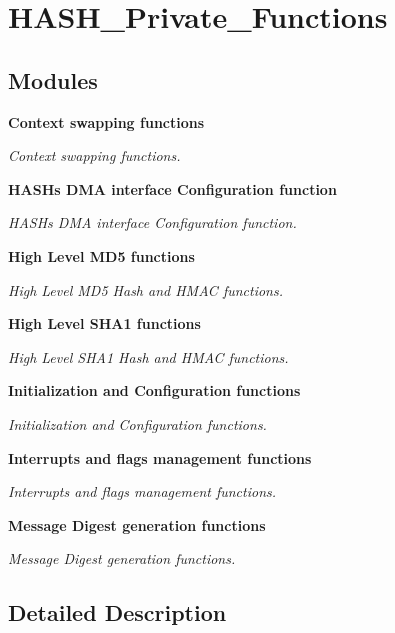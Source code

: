 \section{H\+A\+S\+H\+\_\+\+Private\+\_\+\+Functions}
\label{group__HASH__Private__Functions}
\subsection*{Modules}
\begin{DoxyCompactItemize}
\item 
\textbf{ Context swapping functions}
\begin{DoxyCompactList}\small\item\em Context swapping functions. \end{DoxyCompactList}\item 
\textbf{ H\+A\+S\+H\textquotesingle{}s D\+M\+A interface Configuration function}
\begin{DoxyCompactList}\small\item\em H\+A\+SH\textquotesingle{}s D\+MA interface Configuration function. \end{DoxyCompactList}\item 
\textbf{ High Level M\+D5 functions}
\begin{DoxyCompactList}\small\item\em High Level M\+D5 Hash and H\+M\+AC functions. \end{DoxyCompactList}\item 
\textbf{ High Level S\+H\+A1 functions}
\begin{DoxyCompactList}\small\item\em High Level S\+H\+A1 Hash and H\+M\+AC functions. \end{DoxyCompactList}\item 
\textbf{ Initialization and Configuration functions}
\begin{DoxyCompactList}\small\item\em Initialization and Configuration functions. \end{DoxyCompactList}\item 
\textbf{ Interrupts and flags management functions}
\begin{DoxyCompactList}\small\item\em Interrupts and flags management functions. \end{DoxyCompactList}\item 
\textbf{ Message Digest generation functions}
\begin{DoxyCompactList}\small\item\em Message Digest generation functions. \end{DoxyCompactList}\end{DoxyCompactItemize}


\subsection{Detailed Description}
